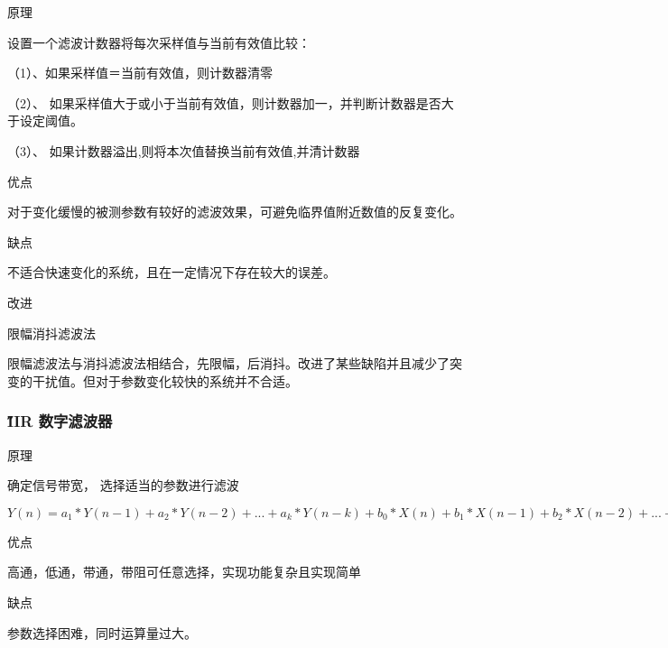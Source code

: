 \documentclass[12pt,a4paper]{article} %
\begin{document}
		\begin{compactitem} 
 			\item 原理
 			\par 设置一个滤波计数器将每次采样值与当前有效值比较：
   			\par （1）、如果采样值＝当前有效值，则计数器清零
                 \par（2）、 如果采样值大于或小于当前有效值，则计数器加一，并判断计数器是否大于设定阈值。
     			\par （3）、 如果计数器溢出,则将本次值替换当前有效值,并清计数器
			
			\item 优点
			\par 对于变化缓慢的被测参数有较好的滤波效果，可避免临界值附近数值的反复变化。
			
			\item 缺点
			\par 不适合快速变化的系统，且在一定情况下存在较大的误差。
 			\item 改进
 			\par 限幅消抖滤波法
 			\par 限幅滤波法与消抖滤波法相结合，先限幅，后消抖。改进了某些缺陷并且减少了突变的干扰值。但对于参数变化较快的系统并不合适。
			
		 \end{compactitem}	
		\subsubsection{\H IIR 数字滤波器 } 
 	
 		\begin{compactitem} 
 			\item 原理
 			\par 确定信号带宽， 选择适当的参数进行滤波
 			\par $Y(n) = a_1*Y(n-1) + a_2*Y(n-2) + ... + a_k*Y(n-k) + b_0*X(n) + b_1*X(n-1) + b_2*X(n-2) + ... + b_k*X(n-k)$
			
			\item 优点
			\par 高通，低通，带通，带阻可任意选择，实现功能复杂且实现简单
			
			\item 缺点
			\par 参数选择困难，同时运算量过大。
			
		 \end{compactitem}	
 	
\end{document}
